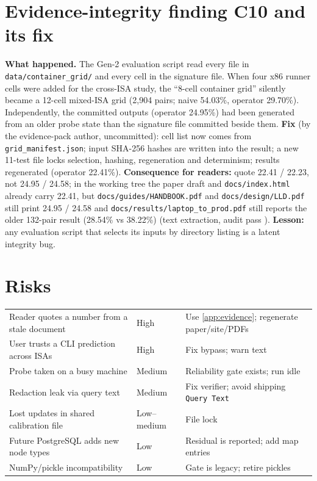 \section{Evidence-integrity finding C10 and its fix}\label{sec:c10}
\textbf{What happened.} The Gen-2 evaluation script read every file in \texttt{data/container\_grid/} and every cell in the signature file. When four x86 runner cells were added for the cross-ISA study, the ``8-cell container grid'' silently became a 12-cell mixed-ISA grid (2{,}904 pairs; naive 54.03\%, operator 29.70\%). Independently, the committed outputs (operator 24.95\%) had been generated from an older probe state than the signature file committed beside them. \textbf{Fix} (by the evidence-pack author, uncommitted): cell list now comes from \texttt{grid\_manifest.json}; input SHA-256 hashes are written into the result; a new 11-test file locks selection, hashing, regeneration and determinism; results regenerated (operator 22.41\%). \textbf{Consequence for readers:} quote 22.41 / 22.23, not 24.95 / 24.58; in the working tree the paper draft and \texttt{docs/index.html} already carry 22.41, but \texttt{docs/guides/HANDBOOK.pdf} and \texttt{docs/design/LLD.pdf} still print 24.95 / 24.58 and \texttt{docs/results/laptop\_to\_prod.pdf} still reports the older 132-pair result (28.54\% vs 38.22\%) (text extraction, audit pass \evRUN).
\textbf{Lesson:} any evaluation script that selects its inputs by directory listing is a latent integrity bug.

\section{Risks}
\begin{center}\small
\begin{tabularx}{\textwidth}{@{}L{4.8cm}L{1.6cm}Y@{}}
\toprule {} &  & \\ \midrule
Reader quotes a number from a stale document & High & Use \cref{app:evidence}; regenerate paper/site/PDFs\\
User trusts a CLI prediction across ISAs & High & Fix bypass; warn text\\
Probe taken on a busy machine & Medium & Reliability gate exists; run idle\\
Redaction leak via query text & Medium & Fix verifier; avoid shipping \texttt{Query Text}\\
Lost updates in shared calibration file & Low--medium & File lock\\
Future PostgreSQL adds new node types & Low & Residual is reported; add map entries\\
NumPy/pickle incompatibility & Low & Gate is legacy; retire pickles\\
\bottomrule
\end{tabularx}
\end{center}

